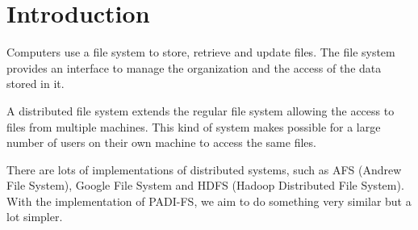 \section{Introduction}

Computers use a file system to store, retrieve and update files. The file
system provides an interface to manage the organization and the access of
the data stored in it.

A distributed file system extends the regular file system allowing the
access to files from multiple machines. This kind of system makes possible
for a large number of users on their own machine to access the same files.

There are lots of implementations of distributed systems, such as AFS 
(Andrew File System), Google File System and HDFS (Hadoop Distributed File 
System). With the implementation of PADI-FS, we aim to do something very
similar but a lot simpler.